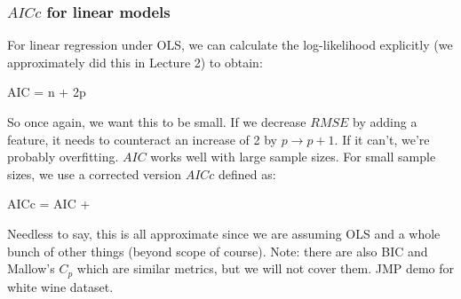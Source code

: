 \documentclass[handout]{beamer}
\begin{document}
\begin{frame}\frametitle{$AICc$ for linear models}
\small
For linear regression under OLS, we can calculate the log-likelihood explicitly (we approximately did this in Lecture 2) to obtain:

\beqn
AIC = n + 2p
\eeqn

\pause So once again, we want this to be small. If we decrease $RMSE$ by adding a feature, it needs to counteract an increase of 2 by $p \rightarrow p+1$. If it can't, we're probably overfitting. \pause $AIC$ works well with large sample sizes. For small sample sizes, we use a corrected version $AICc$ defined as:

\beqn
AICc = AIC + 
\eeqn

Needless to say, this is all approximate since we are assuming OLS and a whole bunch of other things (beyond scope of course). \pause Note: there are also BIC and Mallow's $C_p$ which are similar metrics, but we will not cover them. \pause JMP demo for white wine dataset.
	
\end{frame}

\begin{frame}\frametitle{}

	
\end{frame}
\end{document}
